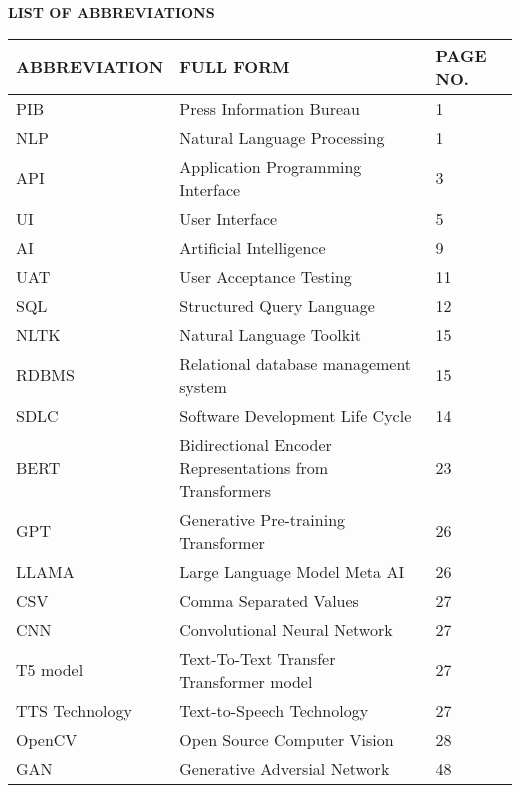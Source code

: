 \documentclass[12pt]{article}
\begin{document}
\pagebreak{}

\begin{center} \fontsize{14}{14}\textbf{LIST OF ABBREVIATIONS} 

\noindent \textbf{ }

\begin{tabular}{|p{1.3in}|p{3.0in}|p{0.8in}|} \hline
\fontsize{12}{12}\textbf{ABBREVIATION } & \fontsize{12}{12}\textbf{FULL FORM } & \fontsize{12}{12}\textbf{PAGE NO. } \\ \hline
PIB  & Press Information Bureau & 1  \\ \hline
NLP & Natural Language Processing & 1 \\ \hline
API & Application Programming Interface & 3 \\ \hline
UI & User Interface & 5 \\ \hline
AI & Artificial Intelligence & 9 \\ \hline
UAT & User Acceptance Testing & 11 \\ \hline
SQL & Structured Query Language  &  12 \\ \hline
NLTK & Natural Language Toolkit & 15 \\ \hline
RDBMS & Relational database management system & 15 \\ \hline
SDLC & Software Development Life Cycle  & 14 \\ \hline
BERT & Bidirectional Encoder Representations from Transformers & 23 \\ \hline
GPT & Generative Pre-training Transformer & 26 \\ \hline
LLAMA & Large Language Model Meta AI & 26 \\ \hline
CSV & Comma Separated Values & 27 \\ \hline
CNN & Convolutional Neural Network & 27 \\ \hline
T5 model & Text-To-Text Transfer Transformer model & 27 \\ \hline
TTS Technology & Text-to-Speech Technology  &  27 \\ \hline
OpenCV & Open Source Computer Vision  & 28 \\ \hline
GAN & Generative Adversial Network  & 48 \\ \hline

\end{tabular}
 \end{center}

 \pagebreak{}
\end{document}
